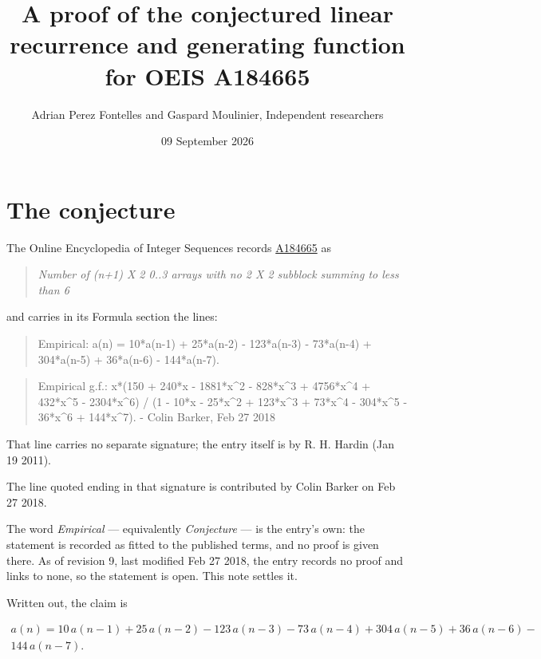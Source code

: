 \documentclass[11pt]{article}
\title{A proof of the conjectured linear recurrence and generating function for OEIS A184665}
\author{Adrian Perez Fontelles and Gaspard Moulinier, Independent researchers}
\date{09 September 2026}
\theoremstyle{definition}
\begin{document}
\maketitle
\section{The conjecture}

The Online Encyclopedia of Integer Sequences records \href{https://oeis.org/A184665}{A184665} as

\begin{quote}\itshape Number of (n+1) X 2 0..3 arrays with no 2 X 2 subblock summing to less than 6\end{quote}

and carries in its Formula section the lines:

\begin{quote}\ttfamily Empirical: a(n) = 10*a(n-1) + 25*a(n-2) - 123*a(n-3) - 73*a(n-4) + 304*a(n-5) + 36*a(n-6) - 144*a(n-7).\end{quote}

\begin{quote}\ttfamily Empirical g.f.: x*(150 + 240*x - 1881*x\textasciicircum{}2 - 828*x\textasciicircum{}3 + 4756*x\textasciicircum{}4 + 432*x\textasciicircum{}5 - 2304*x\textasciicircum{}6) / (1 - 10*x - 25*x\textasciicircum{}2 + 123*x\textasciicircum{}3 + 73*x\textasciicircum{}4 - 304*x\textasciicircum{}5 - 36*x\textasciicircum{}6 + 144*x\textasciicircum{}7). - Colin Barker, Feb 27 2018\end{quote}

That line carries no separate signature; the entry itself is by R. H. Hardin (Jan 19 2011).

The line quoted ending in that signature is contributed by Colin Barker on Feb 27 2018.

The word {\itshape Empirical} --- equivalently {\itshape Conjecture} --- is the entry's own: the statement is recorded as fitted to the published terms, and no proof is given there. As of revision 9, last modified Feb 27 2018, the entry records no proof and links to none, so the statement is open. This note settles it.

Written out, the claim is

\begin{multline*} a(n) = 10\,a(n-1) + 25\,a(n-2) - 123\,a(n-3) - 73\,a(n-4) + 304\,a(n-5) + 36\,a(n-6) - \\ 144\,a(n-7). \end{multline*}
\end{document}
